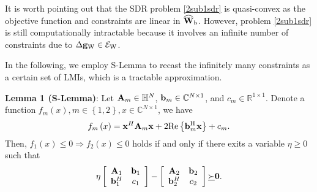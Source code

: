 \documentclass[10pt,journal,letterpaper,twocolumn,twoside]{IEEEtran} %
\begin{document}
It is worth pointing out that the SDR problem \eqref{2sub1sdr} is quasi-convex as the objective
function and constraints are linear in  ${\widehat {\bf{W}}_{\rm{b}}}$. However, problem \eqref{2sub1sdr}
is still computationally intractable because it involves an infinite
number of constraints due to $\Delta {{\bf{g}}_{\rm{W}}} \in {{\cal E}_{\rm{W}}}$.


 In the following, we employ S-Lemma to recast the infinitely many constraints
  as a certain set of LMIs, which  is a tractable  approximation.

\textbf{Lemma 1 (S-Lemma\cite{DWKRobust14})}: Let ${{\bf{A}}_m} \in {{\mathbb{H}}^N}$, ${{\bf{b}}_m} \in {{\mathbb{C}}^{N \times 1}}$, and ${c_m} \in {{\mathbb{R}}^{1 \times 1}}$. Denote
a function ${f_m}\left( x \right),m \in \left\{ {1,2} \right\},x \in {{\mathbb{C}}^{N \times 1}}$, we have
\begin{align}
{f_m}\left( x \right) = {{\bf{x}}^H}{{\bf{A}}_m}{\bf{x}} +
2{\rm Re}\left\{ {{\bf{b}}_m^{\rm{H}}{\bf{x}}} \right\} + {c_m}.
\end{align}
Then, ${f_1}\left( x \right) \le 0 \Rightarrow {f_2}\left( x \right) \le 0$ holds if and only if there
exits a variable ${\eta }  \ge 0$ such that
\begin{align}
{\eta } \left[ {\begin{array}{*{20}{c}}
{{{\bf{A}}_1}}&{{{\bf{b}}_1}}\\
{{\bf{b}}_1^{{H}}}&{{c_1}}
\end{array}} \right] - \left[ {\begin{array}{*{20}{c}}
{{{\bf{A}}_2}}&{{{\bf{b}}_2}}\\
{{\bf{b}}_2^{{H}}}&{{c_2}}
\end{array}} \right]\underline  \succ  {\bf{0}}\label{spro}.
\end{align}
\end{document}
